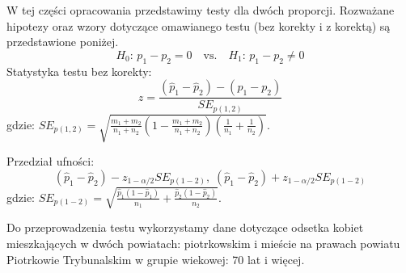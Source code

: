 \documentclass[polish,]{book}
\begin{document}
W tej części opracowania przedstawimy testy dla dwóch proporcji. Rozważane
hipotezy oraz wzory dotyczące omawianego testu (bez korekty i z korektą) są przedstawione poniżej.
\[H_{0}:\,p_1-p_2=0\quad\mbox{vs.}\quad H_{1}:\,p_1-p_2\neq 0\]
Statystyka testu bez korekty:
\begin{equation}
z=\frac{(\hat{p}_1-\hat{p}_2)-(p_1-p_2)}{SE_{p(1,2)}}
\label{eq:wz1164}
\end{equation}
gdzie: \(SE_{p(1,2)}=\sqrt{\frac{m_1+m_2}{n_1+n_2}\left(1-\frac{m_1+m_2}{n_1+n_2}\right)\left(\frac{1}{n_1}+\frac{1}{n_2}\right)}\).

Przedział ufności:
\begin{equation}
(\hat{p}_1-\hat{p}_2)-z_{1-\alpha/2}SE_{p(1-2)},\;(\hat{p}_1-\hat{p}_2)+z_{1-\alpha/2}SE_{p(1-2)}
\label{eq:wz1165}
\end{equation}
gdzie: \(SE_{p(1-2)}=\sqrt{\frac{\hat{p}_1(1-\hat{p}_1)}{n_1}+\frac{\hat{p}_2(1-\hat{p}_2)}{n_2}}\).

Do przeprowadzenia testu wykorzystamy dane dotyczące odsetka kobiet mieszkających w dwóch powiatach: piotrkowskim i mieście na prawach powiatu Piotrkowie
Trybunalskim w grupie wiekowej: 70 lat i więcej.
\end{document}
